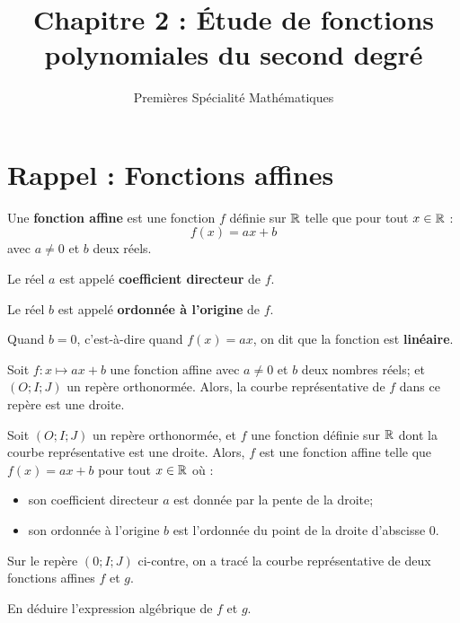 \documentclass{poly}
\title{Chapitre 2 : Étude de fonctions polynomiales du second degré}
\date{}
\author{Premières Spécialité Mathématiques}
\begin{document}
\maketitle
\section{Rappel : Fonctions affines}
\begin{definition}
Une \textbf{fonction affine} est une fonction $f$ définie sur $\mathbb{R}$ telle que pour tout $x \in \mathbb{R}$ :
\begin{equation*}
f(x) = ax + b
\end{equation*}
avec $a \neq 0$ et $b$ deux réels.

Le réel $a$ est appelé \textbf{coefficient directeur} de $f$.

Le réel $b$ est appelé \textbf{ordonnée à l'origine} de $f$.
\end{definition}
\begin{remark}
Quand $b = 0$, c'est-à-dire quand $f(x) = ax$, on dit que la fonction est \textbf{linéaire}.
\end{remark}
\begin{proposition}
Soit $f : x \mapsto ax + b$ une fonction affine avec $a \neq 0$ et $b$ deux nombres réels; et $(O;I;J)$ un repère orthonormée. Alors, la courbe représentative de $f$ dans ce repère est une droite.
\end{proposition}
\begin{proposition}
Soit $(O;I;J)$ un repère orthonormée, et $f$ une fonction définie sur $\mathbb{R}$ dont la courbe représentative est une droite. Alors, $f$ est une fonction affine telle que $f(x) = ax + b$ pour tout $x \in \mathbb{R}$ où :
\begin{itemize}
\item son coefficient directeur $a$ est donnée par la pente de la droite;
\item son ordonnée à l'origine $b$ est l'ordonnée du point de la droite d'abscisse $0$.
\end{itemize}
\end{proposition}
\newpage
\begin{exercize}
Sur le repère $(0;I;J)$ ci-contre, on a tracé la courbe représentative de deux fonctions affines $f$ et $g$.
\begin{center}
\end{center}
En déduire l'expression algébrique de $f$ et $g$.
\end{exercize}
\end{document}
